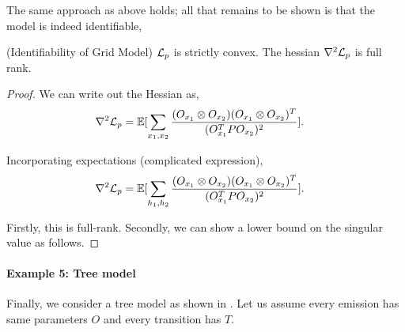 The same approach as above holds; all that remains to be shown is that the model is indeed identifiable,

\begin{theorem}(Identifiability of Grid Model)
  $\mathcal{L}_p$ is strictly convex. The hessian $\nabla^2 \mathcal{L}_p$ is full rank. 
\end{theorem}
\begin{proof}
  We can write out the Hessian as,
\begin{align}
  \nabla^2 \mathcal{L}_p &= \mathbb{E}[ \sum_{x_1, x_2} \frac{ (O_{x_1} \otimes O_{x_2}) (O_{x_1} \otimes O_{x_2})^T }{(O_{x_1}^T P O_{x_2})^2} ].
\end{align}

  Incorporating expectations (complicated expression),
\begin{align}
  \nabla^2 \mathcal{L}_p &= \mathbb{E}[ \sum_{h_1, h_2} \frac{ (O_{x_1} \otimes O_{x_2}) (O_{x_1} \otimes O_{x_2})^T }{(O_{x_1}^T P O_{x_2})^2} ].
\end{align}

  Firstly, this is full-rank. Secondly, we can show a lower bound on the singular value as follows.
\end{proof}

\paragraph{Example 5: Tree model}

Finally, we consider a tree model as shown in . Let us
assume every emission has same parameters $O$ and every transition has
$T$.


